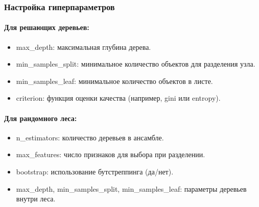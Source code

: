 \begin{enumerate}
\hypertarget{ux43dux430ux441ux442ux440ux43eux439ux43aux430-ux433ux438ux43fux435ux440ux43fux430ux440ux430ux43cux435ux442ux440ux43eux432}{%
\subsubsection*{Настройка
гиперпараметров}\label{ux43dux430ux441ux442ux440ux43eux439ux43aux430-ux433ux438ux43fux435ux440ux43fux430ux440ux430ux43cux435ux442ux440ux43eux432}}

\hypertarget{ux434ux43bux44f-ux440ux435ux448ux430ux44eux449ux438ux445-ux434ux435ux440ux435ux432ux44cux435ux432}{%
\paragraph{Для решающих
деревьев:}\label{ux434ux43bux44f-ux440ux435ux448ux430ux44eux449ux438ux445-ux434ux435ux440ux435ux432ux44cux435ux432}}

\begin{itemize}
\tightlist
\item
  max\_depth: максимальная глубина дерева.
\item
  min\_samples\_split: минимальное количество объектов для
  разделения узла.
\item
  min\_samples\_leaf: минимальное количество объектов в листе.
\item
  criterion: функция оценки качества (например, gini
  или entropy).
\end{itemize}

\hypertarget{ux434ux43bux44f-ux440ux430ux43dux434ux43eux43cux43dux43eux433ux43e-ux43bux435ux441ux430}{%
\paragraph{Для рандомного
леса:}\label{ux434ux43bux44f-ux440ux430ux43dux434ux43eux43cux43dux43eux433ux43e-ux43bux435ux441ux430}}

\begin{itemize}
\tightlist
\item
  n\_estimators: количество деревьев в ансамбле.
\item
  max\_features: число признаков для выбора при разделении.
\item
  bootstrap: использование бутстреппинга (да/нет).
\item
  max\_depth, min\_samples\_split,
  min\_samples\_leaf: параметры деревьев внутри леса.
\end{itemize}

\hypertarget{ux43fux440ux438ux43cux435ux440ux44b-ux43fux440ux438ux43cux435ux43dux435ux43dux438ux44f-1}{%
}
\end{enumerate}
